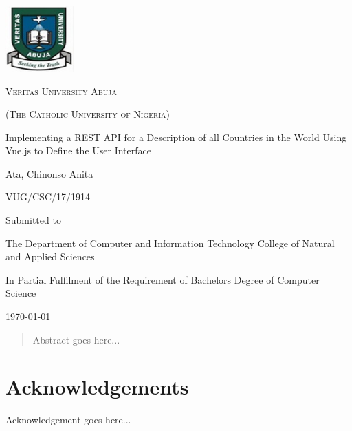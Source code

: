 \documentclass[twoside, a4paper, 12pt]{report}
\begin{document}
\begin{titlepage}
	\centering
	\includegraphics[width=0.2\textwidth]{VeritasUniversityLogo}\par\vspace{1cm}
	{\scshape \LARGE Veritas University Abuja \par}
	{\scshape \Large (The Catholic University of Nigeria) \par}
	\vspace{1cm}
	{\huge Implementing a REST API for a Description of all Countries in the World Using Vue.js to 		Define the User Interface \par}
	\vspace{1.5cm}
	{\Large Ata, Chinonso Anita \par}
	{\Large VUG/CSC/17/1914 \par}
	\vspace{0.5cm}
	Submitted to \par
	\vspace{0.5cm}
	{\Large The Department of Computer and Information Technology College of Natural and Applied 			Sciences \par}
	\vspace{1cm}
	{\Large In Partial Fulfilment of the Requirement of Bachelors Degree of Computer Science \par}
	
	\vfill
	
	{\Large \today \par}
\end{titlepage}

\begin{abstract}
Abstract goes here...
\end{abstract}

\chapter*{Acknowledgements}
Acknowledgement goes here...

\tableofcontents
\listoffigures
\newpage
{}

\onehalfspacing
\end{document}
